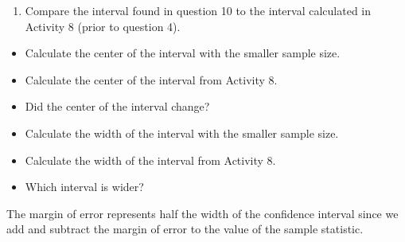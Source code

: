 \documentclass[
]{report}
\providecommand{\tightlist}{%
  \setlength{\itemsep}{0pt}\setlength{\parskip}{0pt}}
\begin{document}
\begin{enumerate}
\def\labelenumi{\arabic{enumi}.}
\setcounter{enumi}{10}
\tightlist
\item
  Compare the interval found in question 10 to the interval calculated in Activity 8 (prior to question 4).
\end{enumerate}

\begin{itemize}
\tightlist
\item
  Calculate the center of the interval with the smaller sample size.
\end{itemize}

\vspace{0.5in}

\begin{itemize}
\tightlist
\item
  Calculate the center of the interval from Activity 8.
\end{itemize}

\vspace{0.5in}

\begin{itemize}
\tightlist
\item
  Did the center of the interval change?
\end{itemize}

\vspace{0.2in}

\begin{itemize}
\tightlist
\item
  Calculate the width of the interval with the smaller sample size.
\end{itemize}

\vspace{0.5in}

\begin{itemize}
\tightlist
\item
  Calculate the width of the interval from Activity 8.
\end{itemize}

\vspace{0.5in}

\begin{itemize}
\tightlist
\item
  Which interval is wider?
\end{itemize}

\vspace{0.4in}

The margin of error represents half the width of the confidence interval since we add and subtract the margin of error to the value of the sample statistic.
\end{document}
